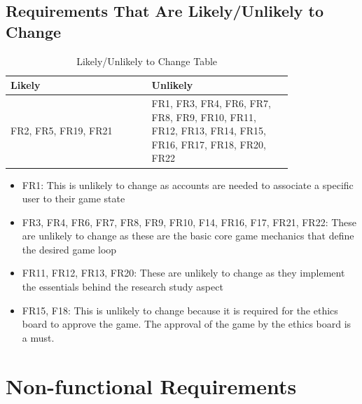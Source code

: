 \documentclass{article}
\begin{document}
\subsection{Requirements That Are Likely/Unlikely to Change}
\begin{table}[H]
    \centering
    \begin{tabular}{|p{0.40\linewidth} | p{0.40\linewidth}|}
    \hline
         Likely & Unlikely \\
         \hline
         FR2, FR5, FR19, FR21 & FR1, FR3, FR4, FR6, FR7, FR8, FR9, FR10, FR11, FR12, FR13, FR14, FR15, FR16, FR17, FR18, FR20, FR22    \\
         \hline
    \end{tabular}
    \caption{Likely/Unlikely to Change Table}
    \label{tab:my_label}
\end{table}
\begin{itemize}
    \item FR1: This is unlikely to change as accounts are needed to associate a specific user to their game state
    \item FR3, FR4, FR6, FR7, FR8, FR9, FR10, F14, FR16, F17, FR21, FR22: These are unlikely to change as these are the basic core game mechanics that define the desired game loop
    \item FR11, FR12, FR13, FR20: These are unlikely to change as they implement the essentials behind the research study aspect
    \item FR15, F18: This is unlikely to change because it is required for the ethics board to approve the game. The approval of the game by the ethics board is a must.
    
\end{itemize}

\section{Non-functional Requirements}
\end{document}
